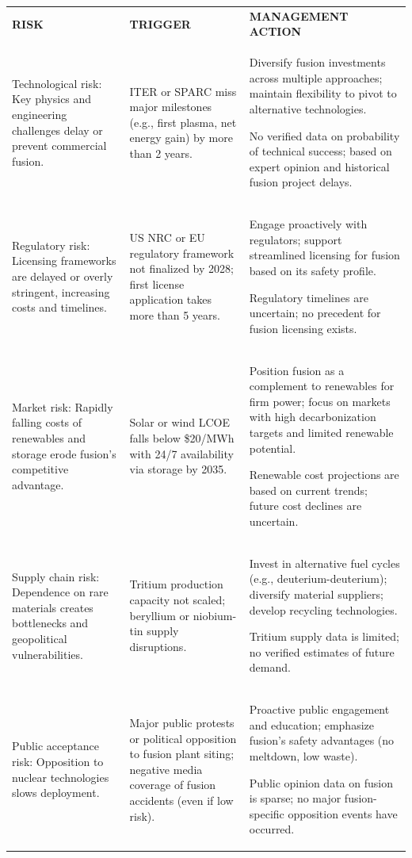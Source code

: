 \documentclass[10pt,a4paper]{article}
\begin{document}
\begin{tabularx}{\linewidth}{p{32mm}Y Y}
{\scriptsize\bfseries\color{BOBlue} RISK} & {\scriptsize\bfseries\color{BOBlue} TRIGGER} & {\scriptsize\bfseries\color{BOBlue} MANAGEMENT ACTION} \\[3pt]
{\scriptsize Technological risk: Key physics and engineering challenges delay or prevent commercial fusion.} & {\scriptsize ITER or SPARC miss major milestones (e.g., first plasma, net energy gain) by more than 2 years.} & {\scriptsize Diversify fusion investments across multiple approaches; maintain flexibility to pivot to alternative technologies.\par\textcolor{BOMuted}{No verified data on probability of technical success; based on expert opinion and historical fusion project delays.}} \\[6pt]
{\scriptsize Regulatory risk: Licensing frameworks are delayed or overly stringent, increasing costs and timelines.} & {\scriptsize US NRC or EU regulatory framework not finalized by 2028; first license application takes more than 5 years.} & {\scriptsize Engage proactively with regulators; support streamlined licensing for fusion based on its safety profile.\par\textcolor{BOMuted}{Regulatory timelines are uncertain; no precedent for fusion licensing exists.}} \\[6pt]
{\scriptsize Market risk: Rapidly falling costs of renewables and storage erode fusion's competitive advantage.} & {\scriptsize Solar or wind LCOE falls below \$20/MWh with 24/7 availability via storage by 2035.} & {\scriptsize Position fusion as a complement to renewables for firm power; focus on markets with high decarbonization targets and limited renewable potential.\par\textcolor{BOMuted}{Renewable cost projections are based on current trends; future cost declines are uncertain.}} \\[6pt]
{\scriptsize Supply chain risk: Dependence on rare materials creates bottlenecks and geopolitical vulnerabilities.} & {\scriptsize Tritium production capacity not scaled; beryllium or niobium-tin supply disruptions.} & {\scriptsize Invest in alternative fuel cycles (e.g., deuterium-deuterium); diversify material suppliers; develop recycling technologies.\par\textcolor{BOMuted}{Tritium supply data is limited; no verified estimates of future demand.}} \\[6pt]
{\scriptsize Public acceptance risk: Opposition to nuclear technologies slows deployment.} & {\scriptsize Major public protests or political opposition to fusion plant siting; negative media coverage of fusion accidents (even if low risk).} & {\scriptsize Proactive public engagement and education; emphasize fusion's safety advantages (no meltdown, low waste).\par\textcolor{BOMuted}{Public opinion data on fusion is sparse; no major fusion-specific opposition events have occurred.}} \\[6pt]

\end{tabularx}
\end{document}
